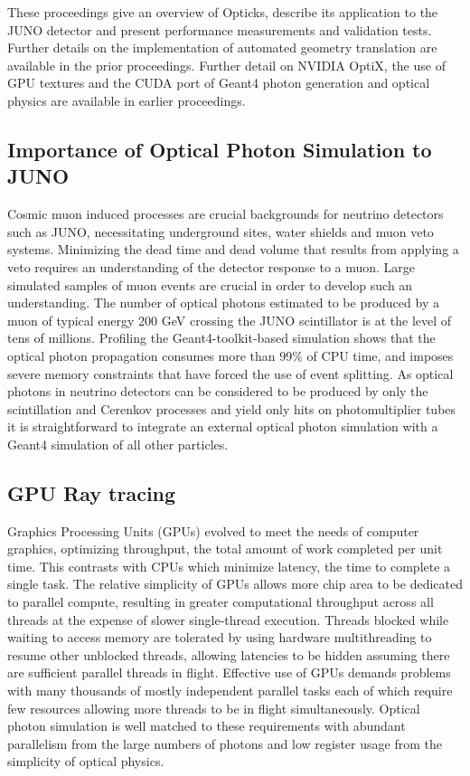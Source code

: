 \documentclass{webofc}
\begin{document}
These proceedings give an overview of Opticks, describe its application to the JUNO detector
and present performance measurements and validation tests. Further details on the implementation of 
automated geometry translation are available in the prior proceedings\cite{chep2018}. 
Further detail on NVIDIA OptiX, the use of GPU textures and the CUDA port of Geant4 
photon generation and optical physics are available in earlier proceedings\cite{chep2016}.
%
%
\subsection{Importance of Optical Photon Simulation to JUNO}%
%
%
Cosmic muon induced processes are crucial backgrounds for neutrino
detectors such as JUNO\cite{juno},
necessitating underground sites, water shields and muon veto systems.
Minimizing the dead time and dead volume that results from applying
a veto requires an understanding of the detector response to a muon.
Large simulated samples of muon events are crucial in order to
develop such an understanding.
%
The number of optical photons estimated to be produced by a muon of
typical energy 200 GeV crossing the JUNO scintillator is at the level of tens of millions.
Profiling the Geant4-toolkit-based simulation shows that the optical photon propagation 
consumes more than 99\% of CPU time, and imposes severe memory constraints that have forced
the use of event splitting.  
%
As optical photons in neutrino detectors can be considered to be produced
by only the scintillation and Cerenkov processes and yield only hits
on photomultiplier tubes it is straightforward to integrate an
external optical photon simulation with a Geant4 simulation of all other particles.
%
\subsection{GPU Ray tracing}%
%
Graphics Processing Units (GPUs) evolved to meet the needs of computer graphics, 
optimizing throughput\cite{throughput}, the total amount of work completed per unit time. 
This contrasts with CPUs which minimize latency, the time to complete a single task. 
The relative simplicity of GPUs allows more chip area to be dedicated to parallel compute, 
resulting in greater computational throughput across all threads at the expense of 
slower single-thread execution. Threads blocked while waiting to access memory are tolerated by using hardware multithreading to 
resume other unblocked threads, allowing latencies to be hidden assuming there are sufficient parallel threads in flight. 
%
Effective use of GPUs demands problems with many thousands of mostly independent parallel 
tasks each of which require few resources allowing more threads to be in flight 
simultaneously.
%
Optical photon simulation is well matched to these requirements with abundant parallelism 
from the large numbers of photons and low register usage from the simplicity of optical physics.
\end{document}

